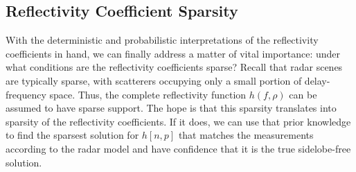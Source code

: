 \subsection{Reflectivity Coefficient Sparsity}
\label{point_target_reflectivity}
With the deterministic and probabilistic interpretations of the reflectivity coefficients in hand, we can finally address a matter of vital importance: under what conditions are the reflectivity coefficients sparse? Recall that radar scenes are typically sparse, with scatterers occupying only a small portion of delay-frequency space. Thus, the complete reflectivity function $h(f, \rho)$ can be assumed to have sparse support. The hope is that this sparsity translates into sparsity of the reflectivity coefficients. If it does, we can use that prior knowledge to find the sparsest solution for $h[n,p]$ that matches the measurements according to the radar model and have confidence that it is the true sidelobe-free solution.

